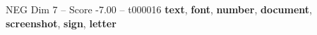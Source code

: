 \begin{textsample}{NEG Dim 7 – Score -7.00 – t000016}  \label{ex:f7_neg_016}
\textbf{text}, \textbf{font}, \textbf{number}, \textbf{document}, \textbf{screenshot}, \textbf{sign}, \textbf{letter}

\end{textsample}
